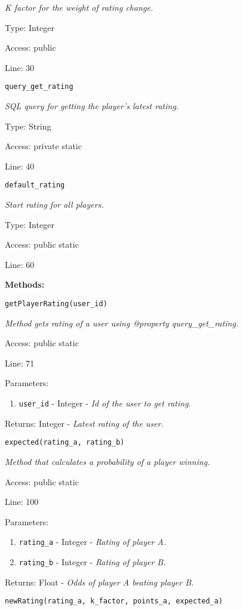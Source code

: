 {\scriptsize
\textit{K factor for the weight of rating change.}

Type: Integer

Access: public

Line: 30

}
\texttt{query\_get\_rating}

{\scriptsize
\textit{SQL query for getting the player's latest rating.}

Type: String

Access: private static

Line: 40

}
\texttt{default\_rating}

{\scriptsize
\textit{Start rating for all players.}

Type: Integer

Access: public static

Line: 60

}
\textbf{Methods:}

\texttt{getPlayerRating(user\_id)}

{\scriptsize
\textit{Method gets rating of a user using @property query\_get\_rating.}

Access: public static

Line: 71

Parameters:

\begin{enumerate}
\item \texttt{user\_id} - Integer - \textit{Id of the user to get rating.}
\end{enumerate}
Returns: Integer - \textit{Latest rating of the user.}

}

\texttt{expected(rating\_a, rating\_b)}

{\scriptsize
\textit{Method that calculates a probability of a player winning.}

Access: public static

Line: 100

Parameters:

\begin{enumerate}
\item \texttt{rating\_a} - Integer - \textit{Rating of player A.}
\item \texttt{rating\_b} - Integer - \textit{Rating of player B.}
\end{enumerate}
Returns: Float - \textit{Odds of player A beating player B.}

}

\texttt{newRating(rating\_a, k\_factor, points\_a, expected\_a)}

